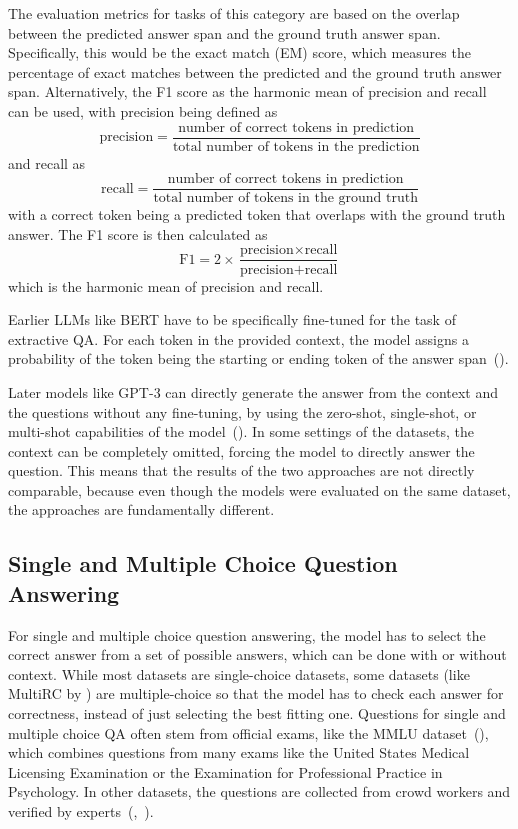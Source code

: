 The evaluation metrics for tasks of this category are based on the overlap between the predicted answer span and the ground truth answer span.
Specifically, this would be the exact match (EM) score, which measures the percentage of exact matches between the predicted and the ground truth answer span.
Alternatively, the F1 score as the harmonic mean of precision and recall can be used, with precision being defined as
\[ \text{precision} = \frac{\text{number of correct tokens in prediction}}{\text{total number of tokens in the prediction}} \]
and recall as
\[ \text{recall} = \frac{\text{number of correct tokens in prediction}}{\text{total number of tokens in the ground truth}} \]
with a correct token being a predicted token that overlaps with the ground truth answer.
The F1 score is then calculated as
\[ \text{F1} = 2 \times \frac{\text{precision} \times \text{recall}}{\text{precision} + \text{recall}} \]
which is the harmonic mean of precision and recall.

Earlier LLMs like BERT have to be specifically fine-tuned for the task of extractive QA.
For each token in the provided context, the model assigns a probability of the token being the starting or ending token of the answer span~(\cite{devlin:2018:BERT}).

Later models like GPT-3 can directly generate the answer from the context and the questions without any fine-tuning, by using the zero-shot, single-shot, or multi-shot capabilities of the model~(\cite{brown:2020:Language}).
In some settings of the datasets, the context can be completely omitted, forcing the model to directly answer the question.
This means that the results of the two approaches are not directly comparable, because even though the models were evaluated on the same dataset, the approaches are fundamentally different.

\subsection{Single and Multiple Choice Question Answering}\label{sec:multiple-choice-qa}
For single and multiple choice question answering, the model has to select the correct answer from a set of possible answers, which can be done with or without context.
While most datasets are single-choice datasets, some datasets (like MultiRC by \cite{khashabi:2018:Looking}) are multiple-choice so that the model has to check each answer for correctness, instead of just selecting the best fitting one.
Questions for single and multiple choice QA often stem from official exams, like the MMLU dataset~(\cite{hendrycks:2020:Measuring}), which combines questions from many exams like the United States Medical Licensing Examination or the Examination for Professional Practice in Psychology.
In other datasets, the questions are collected from crowd workers and verified by experts~(\cite{clark:2018:Think},~\cite{mihaylov:2018:Can}).

